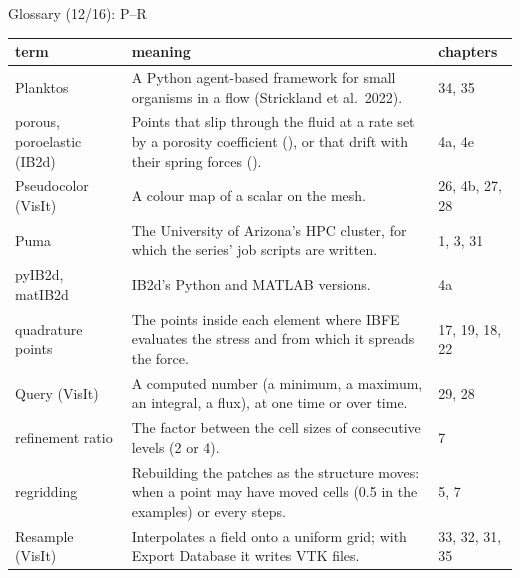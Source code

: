 \documentclass[aspectratio=169,11pt]{beamer}
\makeatletter
\newenvironment{glossarytable}{\scriptsize\renewcommand{\arraystretch}{1.08}%
  \begin{tabular}{@{}L{0.19\textwidth}L{0.63\textwidth}L{0.12\textwidth}@{}}\toprule
  term & meaning & chapters\\\midrule}{\bottomrule\end{tabular}}
\makeatother
\begin{document}
\begin{frame}{Glossary (12/16): P--R}
\label{fr:g12}
\begin{glossarytable}
Planktos & A Python agent-based framework for small organisms in a flow (Strickland et al.\ 2022). & 34, 35\\
porous, poroelastic (IB2d) & Points that slip through the fluid at a rate set by a porosity coefficient (), or that drift with their spring forces (). & 4a, 4e\\
Pseudocolor (VisIt) & A colour map of a scalar on the mesh. & 26, 4b, 27, 28\\
Puma & The University of Arizona's HPC cluster, for which the series' job scripts are written. & 1, 3, 31\\
pyIB2d, matIB2d & IB2d's Python and MATLAB versions. & 4a\\
quadrature points & The points inside each element where IBFE evaluates the stress and from which it spreads the force. & 17, 19, 18, 22\\
Query (VisIt) & A computed number (a minimum, a maximum, an integral, a flux), at one time or over time. & 29, 28\\
refinement ratio & The factor between the cell sizes of consecutive levels (2 or 4). & 7\\
regridding & Rebuilding the patches as the structure moves: when a point may have moved  cells (0.5 in the examples) or every  steps. & 5, 7\\
Resample (VisIt) & Interpolates a field onto a uniform grid; with Export Database it writes VTK files. & 33, 32, 31, 35\\
\end{glossarytable}
\end{frame}
\end{document}
